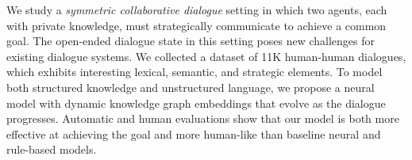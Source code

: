 We study a \emph{symmetric collaborative dialogue} setting in which two agents, each with private knowledge, must strategically communicate to achieve a common goal. The open-ended dialogue state in this setting poses new challenges for existing dialogue systems. We collected a dataset of 11K human-human dialogues, which exhibits interesting lexical, semantic, and strategic elements. To model both structured knowledge and unstructured language, we propose a neural model with dynamic knowledge graph embeddings that evolve as the dialogue progresses. Automatic and human evaluations show that our model is both more effective at achieving the goal and more human-like than baseline neural and rule-based models.
